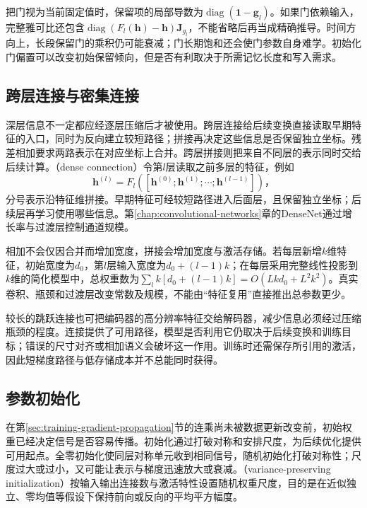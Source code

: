 把门视为当前固定值时，保留项的局部导数为$\operatorname{diag}(\bm1-\bm g_l)$。如果门依赖输入，完整雅可比还包含$\operatorname{diag}(F_l(\bm h)-\bm h)\bm J_{g_l}$，不能省略后再当成精确推导。时间方向上，长段保留门的乘积仍可能衰减；门长期饱和还会使门参数自身难学。初始化门偏置可以改变初始保留倾向，但是否有利取决于所需记忆长度和写入需求。

\subsection{跨层连接与密集连接}
\label{sec:training-dense-connections}

深层信息不一定都应经逐层压缩后才被使用。跨层连接给后续变换直接读取早期特征的入口，同时为反向建立较短路径；拼接再决定这些信息是否保留独立坐标。残差相加要求两路表示在对应坐标上合并。跨层拼接则把来自不同层的表示同时交给后续计算。（dense connection）令第$l$层读取之前多层的特征，例如
\begin{equation}
  \bm h^{(l)}=F_l([\bm h^{(0)};\bm h^{(1)};\cdots;\bm h^{(l-1)}])\text{，}
  \label{eq:training-dense-concat}
\end{equation}
分号表示沿特征维拼接。早期特征可经较短路径进入后面层，且保留独立坐标；后续层再学习使用哪些信息。第\ref{chap:convolutional-networks}章的DenseNet通过增长率与过渡层控制通道规模。

相加不会仅因合并而增加宽度，拼接会增加宽度与激活存储。若每层新增$k$维特征，初始宽度为$d_0$，第$l$层输入宽度为$d_0+(l-1)k$；在每层采用完整线性投影到$k$维的简化模型中，总权重数为$\sum_l k[d_0+(l-1)k]=O(Lkd_0+L^2k^2)$。真实卷积、瓶颈和过渡层改变常数及规模，不能由“特征复用”直接推出总参数更少。

较长的跳跃连接也可把编码器的高分辨率特征交给解码器，减少信息必须经过压缩瓶颈的程度。连接提供了可用路径，模型是否利用它仍取决于后续变换和训练目标；错误的尺寸对齐或相加语义会破坏这一作用。训练时还需保存所引用的激活，因此短梯度路径与低存储成本并不总能同时获得。

\subsection{参数初始化}
\label{sec:training-initialization-constraints}
\label{sec:training-initialization}

在第\ref{sec:training-gradient-propagation}节的连乘尚未被数据更新改变前，初始权重已经决定信号是否容易传播。初始化通过打破对称和安排尺度，为后续优化提供可用起点。全零初始化使同层对称单元收到相同信号，随机初始化打破对称性；尺度过大或过小，又可能让表示与梯度迅速放大或衰减。（variance-preserving initialization）按输入输出连接数与激活特性设置随机权重尺度，目的是在近似独立、零均值等假设下保持前向或反向的平均平方幅度。

